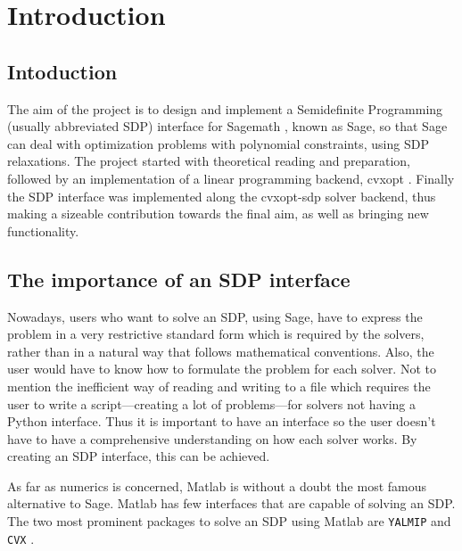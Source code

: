 
\chapter{Introduction} %

\label{Chapter1} %



\section{Intoduction}
The aim of the project is to design and implement a Semidefinite Programming (usually abbreviated SDP)  interface for Sagemath \cite{sagepress}, known as Sage, so that Sage can deal with optimization problems with polynomial constraints, using SDP relaxations. The project started with theoretical reading and preparation, followed by an implementation of a linear programming backend, cvxopt \cite{cvxopthome}. Finally the SDP interface was implemented along the cvxopt-sdp solver backend, thus making a sizeable contribution towards the final aim, as well as bringing new functionality. 



\section{The importance of an SDP interface}
Nowadays, users who want to solve an SDP, using Sage, have to express the problem in a very restrictive standard form which is required by the solvers, rather than in a natural way that follows mathematical conventions.  
 Also, the user would have to know how to formulate the problem for each solver. Not to mention the inefficient way of reading and writing to a file which requires the user to write a script---creating a lot of problems---for solvers
 not having a Python interface.
 Thus it is important to have an interface so the user doesn't have to have a comprehensive understanding on how each solver works. By creating an SDP  interface, this can be achieved. 
	
As far as numerics is concerned, Matlab \cite{matlab} is without a doubt the most famous alternative to Sage. Matlab has few interfaces that are capable of solving an SDP.  The two most prominent packages to solve an SDP using Matlab are \texttt{YALMIP} \cite{yalmip} and \texttt{CVX} \cite{cvx}.

